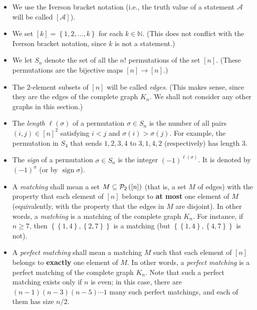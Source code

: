 \documentclass[numbers=enddot,12pt,final,onecolumn,notitlepage]{scrartcl}%
\theoremstyle{definition}
\newcommand{\NN}{\mathbb{N}}
\newcommand{\powset}[2][]{\ifthenelse{\equal{#2}{}}{\mathcal{P}\left(#1\right)}{\mathcal{P}_{#1}\left(#2\right)}}
\newcommand{\set}[1]{\left\{ #1 \right\}}
\newcommand{\tup}[1]{\left( #1 \right)}
\newcommand{\ive}[1]{\left[ #1 \right]}
\begin{document}
\begin{itemize}
\item We use the Iverson bracket notation (i.e., the truth
      value of a statement $\mathcal{A}$ will be called
      $\ive{\mathcal{A}}$).

\item We set $\ive{k} = \set{1, 2, \ldots, k}$ for each
      $k \in \NN$.
      (This does not conflict with the Iverson bracket
      notation, since $k$ is not a statement.)

\item We let $S_n$ denote the set of all the $n!$
      permutations of the set $\ive{n}$.
      (These permutations are the bijective maps
      $\ive{n} \to \ive{n}$.)

\item The $2$-element subsets of $\ive{n}$ will be called
      \textit{edges}.
      (This makes sense, since they are the edges of the
      complete graph $K_n$.
      We shall not consider any other graphs in this
      section.)

\item The \textit{length} $\ell\tup{\sigma}$
      of a permutation $\sigma \in S_n$
      is the number of all pairs $\tup{i, j} \in \ive{n}^2$
      satisfying $i < j$ and $\sigma\tup{i} > \sigma\tup{j}$.
      For example, the permutation in $S_4$ that sends
      $1, 2, 3, 4$ to $3, 1, 4, 2$ (respectively) has
      length $3$.

\item The \textit{sign} of a permutation $\sigma \in S_n$
      is the integer $\tup{-1}^{\ell\tup{\sigma}}$.
      It is denoted by $\tup{-1}^\sigma$
      (or by $\operatorname{sign} \sigma$).

\item A \textit{matching} shall mean a set
      $M \subseteq \powset[2]{\ive{n}}$ (that is, a set
      $M$ of edges) with the
      property that each element of $\ive{n}$ belongs to
      \textbf{at most} one element of $M$
      (equivalently, with the property that the edges
      in $M$ are disjoint).
      In other words, a \textit{matching} is
      a matching of the complete graph $K_n$.
      For instance, if $n \geq 7$, then
      $\set{\set{1, 4}, \set{2, 7}}$ is a matching
      (but $\set{\set{1, 4}, \set{4, 7}}$ is not).

\item A \textit{perfect matching} shall mean
      a matching $M$ such that each element
      of $\ive{n}$ belongs to \textbf{exactly} one element
      of $M$.
      In other words, a \textit{perfect matching}
      is a perfect matching of the complete graph $K_n$.
      Note that such a perfect matching exists only if
      $n$ is even; in this case, there are
      $\tup{n-1} \tup{n-3} \tup{n-5} \cdots 1$ many such
      perfect matchings, and each of them has size $n/2$.


\end{itemize}
\end{document}
